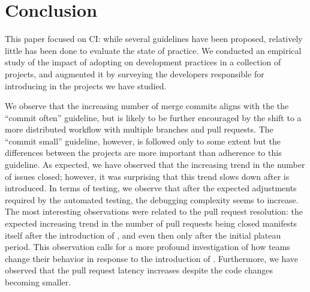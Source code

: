 
\section{Conclusion}
\label{sec:conc}

This paper focused on CI: while several guidelines have been proposed, relatively little has been done to evaluate the 
state of practice.
We conducted an 
empirical study of the impact of adopting \Tvis on development practices in a collection of \GH projects,
and augmented it by surveying the developers responsible for introducing \Tvis in the projects we have studied.

We observe that the increasing number of merge commits aligns with the the ``commit often'' guideline, but is likely to be further encouraged by the shift to a more distributed workflow with multiple branches and pull requests.
The ``commit small'' guideline, however, is followed only to some extent but the differences between the projects are more important than adherence to this guideline.
As expected, we have observed that the increasing trend in the number of issues closed; however, it was surprising that this trend slows down after \Tvis is introduced.
In terms of testing, we observe that after the expected adjustments required by the automated testing, the debugging complexity seems to increase. 
The most interesting observations were related to the pull request resolution: the expected increasing trend in the number of pull requests being closed manifests itself after the introduction of \Tvis, and even then only after the initial plateau period. 
This observation calls for a more profound investigation of how \GH teams change their behavior in response to the introduction of \Tvis. 
Furthermore, we have observed that the pull request latency increases  despite the code changes becoming smaller.
